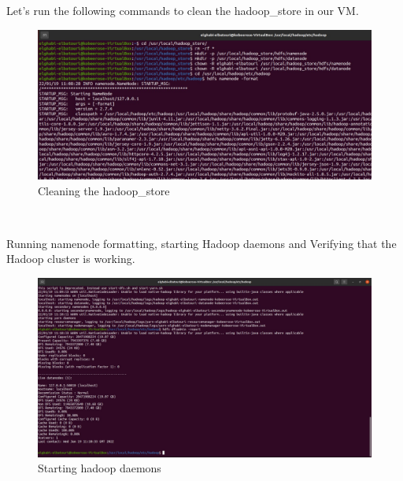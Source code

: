 \begin{spacing}{1.2}
\par Let's run the following commands to clean the hadoop\_store in our VM.
\\
\begin{figure}[!htb] 
\begin{center} 
\includegraphics[width=1\linewidth]{Pictures/HBase/Configuring Hbase in Standalone & Pseudo-distributed mode/Installing and Configuring Apache Hbase/Cleaning the hadoop_store} 
\end{center} 
\caption{Cleaning the hadoop\_store} 
\end{figure}  \FloatBarrier
\\

\par Running namenode formatting, starting Hadoop daemons and Verifying that the Hadoop cluster is working.
\\
\begin{figure}[!htb] 
\begin{center} 
\includegraphics[width=1\linewidth]{Pictures/HBase/Configuring Hbase in Standalone & Pseudo-distributed mode/Installing and Configuring Apache Hbase/Starting hadoop daemons} 
\end{center} 
\caption{Starting hadoop daemons} 
\end{figure}  \FloatBarrier
\\


\end{spacing}
